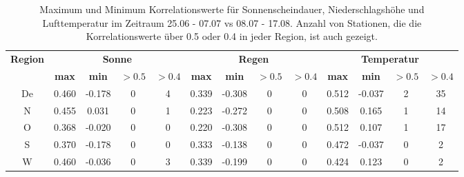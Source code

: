 \documentclass[11pt]{article}
\begin{document}
\begin{landscape}
\begin{table*}
\centering   
\caption{Maximum und Minimum Korrelationswerte f\"ur Sonnenscheindauer, Niederschlagsh\"ohe und Lufttemperatur im Zeitraum 25.06 - 07.07  vs  08.07 - 17.08. Anzahl von Stationen, die die Korrelationswerte  \"uber  0.5 oder 0.4 in jeder Region, ist auch gezeigt. \\} 
\label{tab:}  
\renewcommand{\arraystretch}{1.3}
 \begin{small}
\begin{tabular}{ccccccccccccc}
  \toprule
   \multicolumn{1}{r}{\multirow{2}{1.2cm}{\textbf{Region}}}
 & \multicolumn{4}{c}{\textbf{Sonne}}
& \multicolumn{4}{c}{\textbf{Regen}}
& \multicolumn{4}{c}{\textbf{Temperatur}} \\
\cline{2-13} 
 & \textbf{max} & \textbf{min} & \textbf{$>0.5$} & \textbf{$>0.4$} & \textbf{max} & \textbf{min} & \textbf{$>0.5$} & \textbf{$>0.4$} & \textbf{max} & \textbf{min} & \textbf{$>0.5$} & \textbf{$>0.4$} \\ 
  \midrule
De & 0.460 & -0.178 & 0 & 4 & 0.339 & -0.308 & 0 & 0 & 0.512 & -0.037 & 2 & 35 \\ 
  N & 0.455 & 0.031 & 0 & 1 & 0.223 & -0.272 & 0 & 0 & 0.508 & 0.165 & 1 & 14 \\ 
  O & 0.368 & -0.020 & 0 & 0 & 0.220 & -0.308 & 0 & 0 & 0.512 & 0.107 & 1 & 17 \\ 
  S & 0.370 & -0.178 & 0 & 0 & 0.333 & -0.138 & 0 & 0 & 0.472 & -0.037 & 0 & 2 \\ 
  W & 0.460 & -0.036 & 0 & 3 & 0.339 & -0.199 & 0 & 0 & 0.424 & 0.123 & 0 & 2 \\ 
   \bottomrule
\end{tabular}
\end{small}
\end{table*}
\end{landscape}
\end{document}
